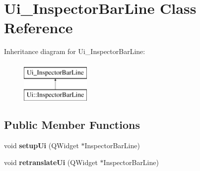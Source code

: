 \hypertarget{class_ui___inspector_bar_line}{}\section{Ui\+\_\+\+Inspector\+Bar\+Line Class Reference}
\label{class_ui___inspector_bar_line}
Inheritance diagram for Ui\+\_\+\+Inspector\+Bar\+Line\+:\begin{figure}[H]
\begin{center}
\leavevmode
\includegraphics[height=2.000000cm]{class_ui___inspector_bar_line}
\end{center}
\end{figure}
\subsection*{Public Member Functions}
\begin{DoxyCompactItemize}
\item 
\mbox{\label{class_ui___inspector_bar_line_ab6ca3c453a451dd13465133bcdb120db}} 
void {\bfseries setup\+Ui} (Q\+Widget $\ast$Inspector\+Bar\+Line)
\item 
\mbox{\label{class_ui___inspector_bar_line_a502b9b8c2c2087ce0a765674ad9649d6}} 
void {\bfseries retranslate\+Ui} (Q\+Widget $\ast$Inspector\+Bar\+Line)
\end{DoxyCompactItemize}
